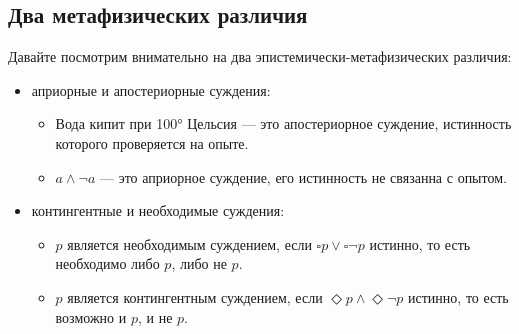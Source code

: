 \documentclass[openany]{book}
\theoremstyle{plain}
\theoremstyle{definition}
\begin{document}
\subsection{ Два метафизических различия }

Давайте посмотрим внимательно на два эпистемически-метафизических различия:
\begin{itemize}
\item априорные и апостериорные суждения:
	\begin{itemize}
		\item Вода кипит при 100° Цельсия --- это апостериорное суждение, истинность которого проверяется на опыте.
		\item \(a \land \neg a\) --- это априорное суждение, его истинность не связанна с опытом.
	\end{itemize}
\item контингентные и необходимые суждения:
	\begin{itemize}
		\item \(p\) является необходимым суждением, если \(\square p \lor \square \neg p\) истинно, то есть необходимо либо \(p\), либо не \(p\).
		\item \(p\) является контингентным суждением, если \(\Diamond p \land \Diamond \neg p\) истинно, то есть возможно и \(p\), и не \(p\).
	\end{itemize}
\end{itemize}    
\end{document}
